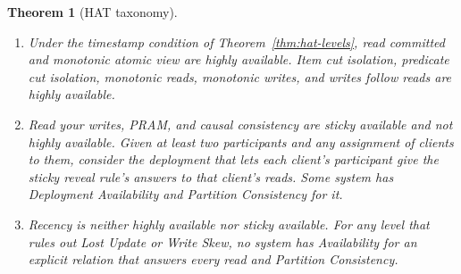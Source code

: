 \documentclass[sigconf]{cidr-2027}
\newtheorem{theorem}{Theorem}
\theoremstyle{remark}
\begin{document}
\begin{theorem}[HAT taxonomy]
\label{thm:hat-taxonomy}
\leavevmode
\begin{enumerate}
\item
Under the timestamp condition of Theorem~\ref{thm:hat-levels}, read
        committed and monotonic atomic view are highly available. Item cut
        isolation, predicate cut isolation, monotonic reads, monotonic
        writes, and writes follow reads are highly available.
\item
Read your writes, PRAM, and causal consistency are sticky available
        and not highly available. Given at least two participants and any
        assignment of clients to them, consider the deployment that lets each
        client's participant give the sticky reveal rule's answers to that
        client's reads. Some system has Deployment Availability and Partition
        Consistency for it.
\item
Recency is neither highly available nor sticky available. For any
        level that rules out Lost Update or Write Skew, no system has
        Availability for an explicit relation that answers every read and
        Partition Consistency.
\end{enumerate}
\end{theorem}
\end{document}
